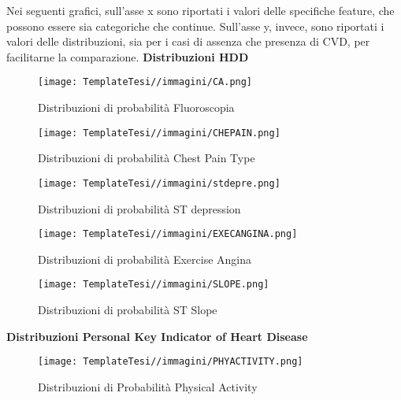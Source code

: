 Nei seguenti grafici, sull'asse x sono riportati i valori delle specifiche feature, che possono essere sia categoriche che continue. Sull'asse y, invece, sono riportati i valori delle distribuzioni, sia per i casi di assenza che presenza di CVD, per facilitarne la comparazione.
\newline
\textbf{Distribuzioni HDD}
\newline



\begin{figure}[H]
    \centering
    \texttt{[image: TemplateTesi//immagini/CA.png]}
    \caption{Distribuzioni di probabilità Fluoroscopia}
    \label{fig:dpHDDfluoro}
\end{figure}

\begin{figure}[H]
    \centering
    \texttt{[image: TemplateTesi//immagini/CHEPAIN.png]}
    \caption{Distribuzioni di probabilità Chest Pain Type}
    \label{fig:dpHDDchepain}
\end{figure}

\begin{figure}[H]
    \centering
    \texttt{[image: TemplateTesi//immagini/stdepre.png]}
    \caption{Distribuzioni di probabilità ST depression}
    \label{fig:dpHDDstdepre}
\end{figure}

\begin{figure}[H]
    \centering
    \texttt{[image: TemplateTesi//immagini/EXECANGINA.png]}
    \caption{Distribuzioni di probabilità Exercise Angina}
    \label{fig:dpHDDanginaexe}
\end{figure}



\begin{figure}[H]
    \centering
    \texttt{[image: TemplateTesi//immagini/SLOPE.png]}
    \caption{Distribuzioni di probabilità ST Slope}
    \label{fig:dpHDDSlope}
\end{figure}
\newline
\textbf{Distribuzioni Personal Key Indicator of Heart Disease}
\newline

\begin{figure}[H]
    \centering
    \texttt{[image: TemplateTesi//immagini/PHYACTIVITY.png]}
    \caption{Distribuzioni di Probabilità Physical Activity}
    \label{fig:dpPKIphyact}
\end{figure}


